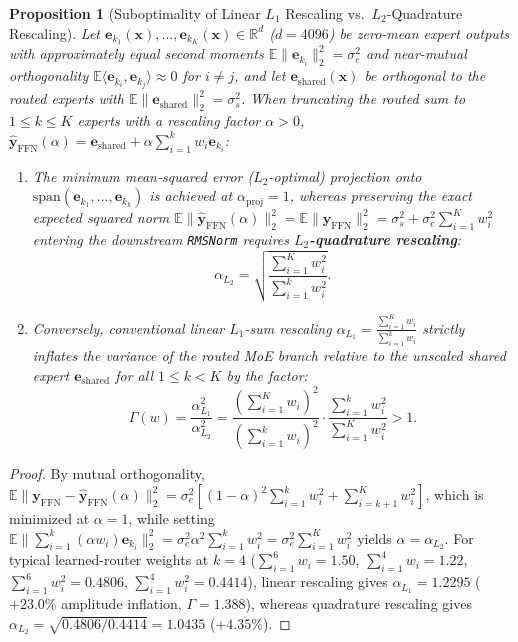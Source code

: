 \documentclass[10pt,twocolumn]{article}
\newtheorem{proposition}{Proposition}
\begin{document}
\begin{proposition}[Suboptimality of Linear $L_1$ Rescaling vs.\ $L_2$-Quadrature Rescaling]
Let $\mathbf{e}_{k_1}(\mathbf{x}), \dots, \mathbf{e}_{k_K}(\mathbf{x}) \in \mathbb{R}^d$ ($d=4096$) be zero-mean expert outputs with approximately equal second moments $\mathbb{E}\|\mathbf{e}_{k_i}\|_2^2 = \sigma_e^2$ and near-mutual orthogonality $\mathbb{E}\langle \mathbf{e}_{k_i}, \mathbf{e}_{k_j}\rangle \approx 0$ for $i \neq j$, and let $\mathbf{e}_{\text{shared}}(\mathbf{x})$ be orthogonal to the routed experts with $\mathbb{E}\|\mathbf{e}_{\text{shared}}\|_2^2 = \sigma_s^2$. When truncating the routed sum to $1 \le k \le K$ experts with a rescaling factor $\alpha > 0$, $\hat{\mathbf{y}}_{\text{FFN}}(\alpha) = \mathbf{e}_{\text{shared}} + \alpha \sum_{i=1}^k w_i \mathbf{e}_{k_i}$:
\begin{enumerate}
    \item The minimum mean-squared error ($L_2$-optimal) projection onto $\text{span}(\mathbf{e}_{k_1}, \dots, \mathbf{e}_{k_k})$ is achieved at $\alpha_{\text{proj}} = 1$, whereas preserving the exact expected squared norm $\mathbb{E}\|\hat{\mathbf{y}}_{\text{FFN}}(\alpha)\|_2^2 = \mathbb{E}\|\mathbf{y}_{\text{FFN}}\|_2^2 = \sigma_s^2 + \sigma_e^2 \sum_{i=1}^K w_i^2$ entering the downstream \texttt{RMSNorm} requires \textbf{$L_2$-quadrature rescaling}:
    \begin{equation}
        \alpha_{L_2} = \sqrt{\frac{\sum_{i=1}^{K} w_i^2}{\sum_{i=1}^{k} w_i^2}}.
    \end{equation}
    \item Conversely, conventional linear $L_1$-sum rescaling $\alpha_{L_1} = \frac{\sum_{i=1}^K w_i}{\sum_{i=1}^k w_i}$ strictly inflates the variance of the routed MoE branch relative to the unscaled shared expert $\mathbf{e}_{\text{shared}}$ for all $1 \le k < K$ by the factor:
    \begin{equation}
        \Gamma(w) = \frac{\alpha_{L_1}^2}{\alpha_{L_2}^2} = \frac{\left(\sum_{i=1}^K w_i\right)^2}{\left(\sum_{i=1}^k w_i\right)^2} \cdot \frac{\sum_{i=1}^k w_i^2}{\sum_{i=1}^K w_i^2} > 1.
    \end{equation}
\end{enumerate}
\end{proposition}

\begin{proof}
By mutual orthogonality, $\mathbb{E}\|\mathbf{y}_{\text{FFN}} - \hat{\mathbf{y}}_{\text{FFN}}(\alpha)\|_2^2 = \sigma_e^2 \left[(1 - \alpha)^2 \sum_{i=1}^k w_i^2 + \sum_{i=k+1}^K w_i^2\right]$, which is minimized at $\alpha = 1$, while setting $\mathbb{E}\|\sum_{i=1}^k (\alpha w_i) \mathbf{e}_{k_i}\|_2^2 = \sigma_e^2 \alpha^2 \sum_{i=1}^k w_i^2 = \sigma_e^2 \sum_{i=1}^K w_i^2$ yields $\alpha = \alpha_{L_2}$. For typical learned-router weights at $k=4$ ($\sum_{i=1}^6 w_i = 1.50$, $\sum_{i=1}^4 w_i = 1.22$, $\sum_{i=1}^6 w_i^2 = 0.4806$, $\sum_{i=1}^4 w_i^2 = 0.4414$), linear rescaling gives $\alpha_{L_1} = 1.2295$ ($+23.0\%$ amplitude inflation, $\Gamma = 1.388$), whereas quadrature rescaling gives $\alpha_{L_2} = \sqrt{0.4806/0.4414} = 1.0435$ ($+4.35\%$).
\end{proof}
\end{document}
